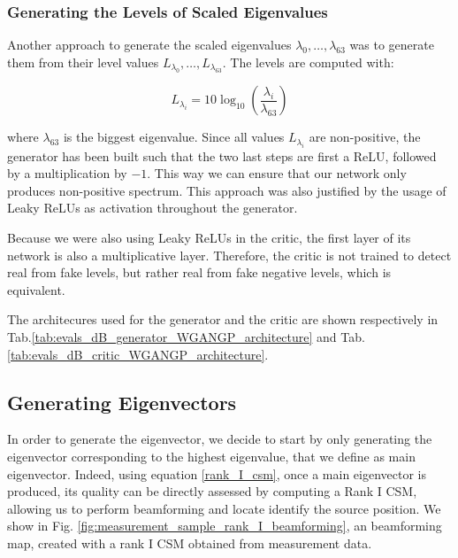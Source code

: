 \documentclass[11pt,a4paper,twoside]{report}
\begin{document}
\subsubsection{Generating the Levels of Scaled Eigenvalues}

Another approach to generate the scaled eigenvalues $\lambda_0, \dots, \lambda_{63}$ was to generate them from their level values $ L_{\lambda_0} , \dots,  L_{\lambda_{63}} $. The levels are computed with:

\begin{equation}
    L_{\lambda_i} = 10 \log_{10}(\frac{\lambda_i}{\lambda_{63}})
\end{equation}

where $\lambda_{63}$ is the biggest eigenvalue.  Since all values $L_{\lambda_i}$ are non-positive, the generator has been built such that the two last steps are first a ReLU, followed by a multiplication by $-1$. This way we can ensure that our network only produces non-positive spectrum. This approach was also justified by the usage of Leaky ReLUs as activation throughout the generator. 

Because we were also using Leaky ReLUs in the critic, the first layer of its network is  also a multiplicative layer. Therefore, the critic is not trained to detect real from fake levels, but rather real from fake negative levels, which is equivalent. 

The architecures used for the generator and the critic are shown respectively in Tab.\ref{tab:evals_dB_generator_WGANGP_architecture} and Tab.\ref{tab:evals_dB_critic_WGANGP_architecture}.


\subsection{Generating Eigenvectors}

In order to generate the eigenvector, we decide to start by only generating the eigenvector corresponding to the highest eigenvalue, that we define as main eigenvector. Indeed, using equation \ref{rank_I_csm}, once a main eigenvector is produced, its quality can be directly assessed by computing a Rank I CSM, allowing us to perform beamforming and locate identify the source position. We show in Fig. \ref{fig:measurement_sample_rank_I_beamforming}, an beamforming map, created with a rank I CSM obtained from measurement data.
\end{document}
